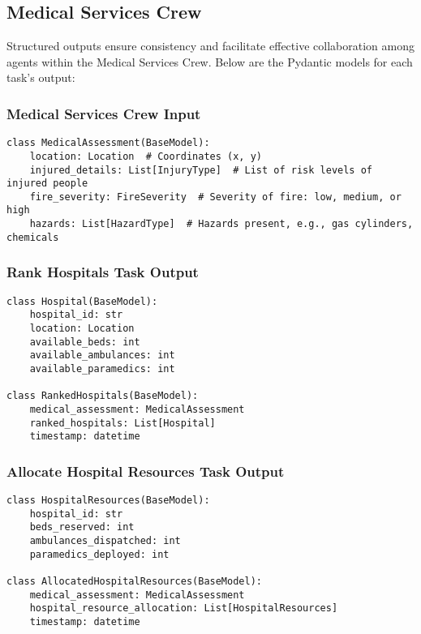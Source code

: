 \subsection{Medical Services Crew}

Structured outputs ensure consistency and facilitate effective collaboration among agents within the Medical Services Crew. Below are the Pydantic models for each task's output:

\subsubsection{Medical Services Crew Input}
\begin{lstlisting}[caption={Pydantic model for Medical Services Crew Input}]
class MedicalAssessment(BaseModel):
    location: Location  # Coordinates (x, y)
    injured_details: List[InjuryType]  # List of risk levels of injured people
    fire_severity: FireSeverity  # Severity of fire: low, medium, or high
    hazards: List[HazardType]  # Hazards present, e.g., gas cylinders, chemicals
\end{lstlisting}

\subsubsection{Rank Hospitals Task Output}
\begin{lstlisting}[caption={Pydantic model for Rank Hospitals Task Output}]
class Hospital(BaseModel):
    hospital_id: str
    location: Location
    available_beds: int
    available_ambulances: int
    available_paramedics: int

class RankedHospitals(BaseModel):
    medical_assessment: MedicalAssessment
    ranked_hospitals: List[Hospital]
    timestamp: datetime
\end{lstlisting}

\subsubsection{Allocate Hospital Resources Task Output}
\begin{lstlisting}[caption={Pydantic model for Allocate Hospital Resources Task Output}]
class HospitalResources(BaseModel):
    hospital_id: str
    beds_reserved: int
    ambulances_dispatched: int
    paramedics_deployed: int

class AllocatedHospitalResources(BaseModel):
    medical_assessment: MedicalAssessment
    hospital_resource_allocation: List[HospitalResources]
    timestamp: datetime
\end{lstlisting}


